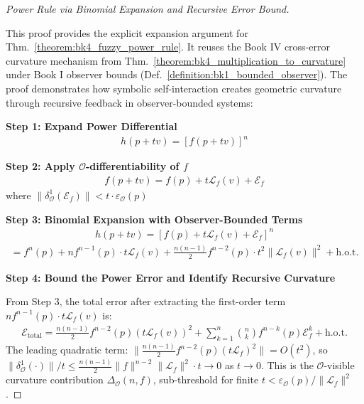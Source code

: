 \begin{proof}[Power Rule via Binomial Expansion and Recursive Error Bound]
\label{proof:bk4_sketch_extracting_recrusive_curvature}
\leavevmode

This proof provides the explicit expansion argument for
Thm.~\ref{theorem:bk4_fuzzy_power_rule}.
It reuses the Book IV cross-error curvature mechanism from
Thm.~\ref{theorem:bk4_multiplication_to_curvature} under Book I observer
bounds (Def.~\ref{definition:bk1_bounded_observer}).
The proof demonstrates how symbolic self-interaction creates geometric curvature through recursive feedback in observer-bounded systems:

\textbf{Step 1: Expand Power Differential}
\begin{align}
h(p + tv) = [f(p + tv)]^n
\end{align}

\textbf{Step 2: Apply $\mathcal{O}$-differentiability of $f$}
\begin{align}
f(p + tv) = f(p) + t\mathcal{L}_f(v) + \mathcal{E}_f
\end{align}
where $\|\delta^1_{\mathcal{O}}(\mathcal{E}_f)\| < t \cdot \varepsilon_{\mathcal{O}}(p)$

\textbf{Step 3: Binomial Expansion with Observer-Bounded Terms}
\begin{align}
h(p + tv) = [f(p) + t\mathcal{L}_f(v) + \mathcal{E}_f]^n
\end{align}
\begin{align}
= f^n(p) + n f^{n-1}(p) \cdot t\mathcal{L}_f(v) + \frac{n(n-1)}{2} f^{n-2}(p) \cdot t^2\|\mathcal{L}_f(v)\|^2 + \text{h.o.t.}
\end{align}

\textbf{Step 4: Bound the Power Error and Identify Recursive Curvature}

From Step 3, the total error after extracting the first-order term $n f^{n-1}(p)\cdot t\mathcal{L}_f(v)$ is:
\begin{align}
\mathcal{E}_{\text{total}} = \frac{n(n-1)}{2}f^{n-2}(p)(t\mathcal{L}_f(v))^2 + \sum_{k=1}^{n}\binom{n}{k}f^{n-k}(p)\mathcal{E}_f^k + \text{h.o.t.}
\end{align}
The leading quadratic term: $\|\frac{n(n-1)}{2}f^{n-2}(p)(t\mathcal{L}_f)^2\| = O(t^2)$, so $\|\delta^1_{\mathcal{O}}(\cdot)\|/t \leq \frac{n(n-1)}{2}\|f\|^{n-2}\|\mathcal{L}_f\|^2 \cdot t \to 0$ as $t \to 0$. This is the $\mathcal{O}$-visible curvature contribution $\Delta_{\mathcal{O}}(n,f)$, sub-threshold for finite $t < \varepsilon_{\mathcal{O}}(p)/\|\mathcal{L}_f\|^2$.


\end{proof}
